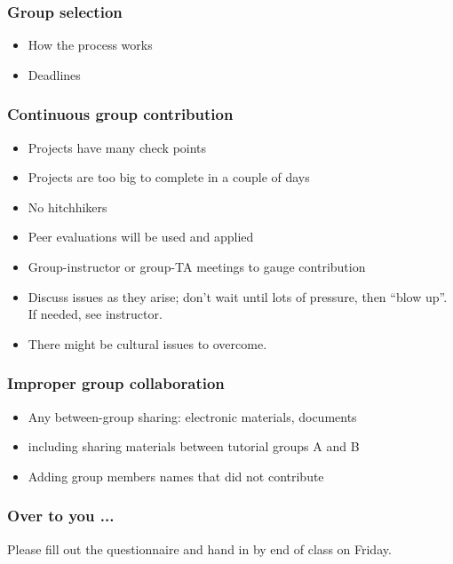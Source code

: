 \begin{frame}\frametitle{Group selection}
	\begin{itemize}
		\item	How the process works
		\item	Deadlines
	\end{itemize}
\end{frame}

\begin{frame}\frametitle{Continuous group contribution}
	\begin{itemize}
		\item	Projects have many check points
		\item	Projects are too big to complete in a couple of days
		\item	No hitchhikers
		\item	Peer evaluations will be used and applied
		\item	Group-instructor or group-TA meetings to gauge contribution
		\item	Discuss issues as they arise; don't wait until lots of pressure, then ``blow up''.  If needed, see instructor.
		\item	There might be cultural issues to overcome.
	\end{itemize}
\end{frame}

\begin{frame}\frametitle{Improper group collaboration}
	\begin{itemize}
		\item	Any between-group sharing: electronic materials, documents
		\item	including sharing materials between tutorial groups A and B
		\item	Adding group members names that did not contribute
	\end{itemize}
\end{frame}

\begin{frame}\frametitle{Over to you ...}
	Please fill out the questionnaire and hand in by end of class on Friday.
\end{frame}
